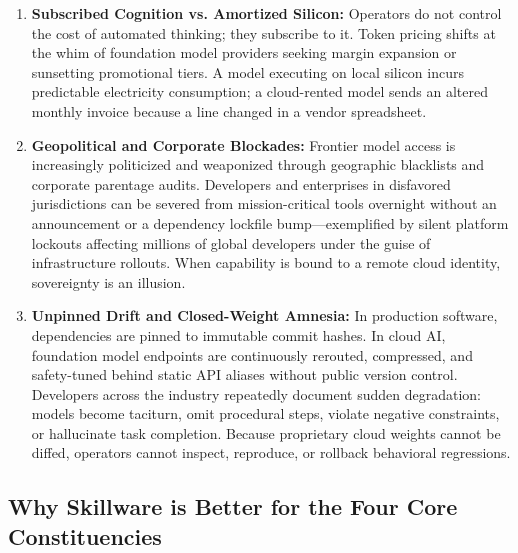 \begin{enumerate}[leftmargin=*]
  When an upstream cloud infrastructure degrades---\allowbreak exemplified by the August 2026 cascading incident where sidecar proxy exhaustion, auth collapse, and client-side retry storms paralyzed repositories, CI pipelines, and Copilot on the identical incident clock---\allowbreak the entire cognitive workflow halts. Competing chat interfaces and cloud APIs frequently share identical geographical corridors and cooling zones. When the pipe darkens, an enterprise does not merely experience latency; it loses the digital hands it hired. Real operational autonomy requires that capability execution reside on local silicon, independent of external network availability.
  \item \textbf{Subscribed Cognition vs. Amortized Silicon:} Operators do not control the cost of automated thinking; they subscribe to it. Token pricing shifts at the whim of foundation model providers seeking margin expansion or sunsetting promotional tiers. A model executing on local silicon incurs predictable electricity consumption; a cloud-rented model sends an altered monthly invoice because a line changed in a vendor spreadsheet.
  \item \textbf{Geopolitical and Corporate Blockades:} Frontier model access is increasingly politicized and weaponized through geographic blacklists and corporate parentage audits. Developers and enterprises in disfavored jurisdictions can be severed from mission-critical tools overnight without an announcement or a dependency lockfile bump---exemplified by silent platform lockouts affecting millions of global developers under the guise of infrastructure rollouts. When capability is bound to a remote cloud identity, sovereignty is an illusion.
  \item \textbf{Unpinned Drift and Closed-Weight Amnesia:} In production software, dependencies are pinned to immutable commit hashes. In cloud AI, foundation model endpoints are continuously rerouted, compressed, and safety-tuned behind static API aliases without public version control. Developers across the industry repeatedly document sudden degradation: models become taciturn, omit procedural steps, violate negative constraints, or hallucinate task completion. Because proprietary cloud weights cannot be diffed, operators cannot inspect, reproduce, or rollback behavioral regressions.
\end{enumerate}

\subsection{Why Skillware is Better for the Four Core Constituencies}
\label{subsec:four_constituencies}

